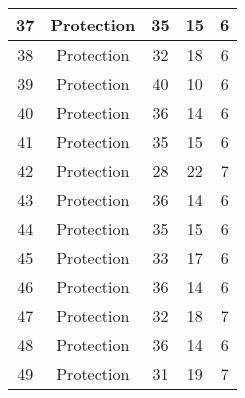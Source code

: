 \documentclass[results.tex]{subfiles}
\begin{document}
\begin{center}
\begin{tabular}{| c || c | c | c | c |}
            \hline
            37                      & Protection                   & 35                     & 15                      & 6                    \\
            \hline
            38                      & Protection                   & 32                     & 18                      & 6                    \\
            \hline
            39                      & Protection                   & 40                     & 10                      & 6                    \\
            \hline
            40                      & Protection                   & 36                     & 14                      & 6                    \\
            \hline
            41                      & Protection                   & 35                     & 15                      & 6                    \\
            \hline
            42                      & Protection                   & 28                     & 22                      & 7                    \\
            \hline
            43                      & Protection                   & 36                     & 14                      & 6                    \\
            \hline
            44                      & Protection                   & 35                     & 15                      & 6                    \\
            \hline
            45                      & Protection                   & 33                     & 17                      & 6                    \\
            \hline
            46                      & Protection                   & 36                     & 14                      & 6                    \\
            \hline
            47                      & Protection                   & 32                     & 18                      & 7                    \\
            \hline
            48                      & Protection                   & 36                     & 14                      & 6                    \\
            \hline
            49                      & Protection                   & 31                     & 19                      & 7                    \\
            \hline
        \end{tabular}
    \end{center}
\end{document}
